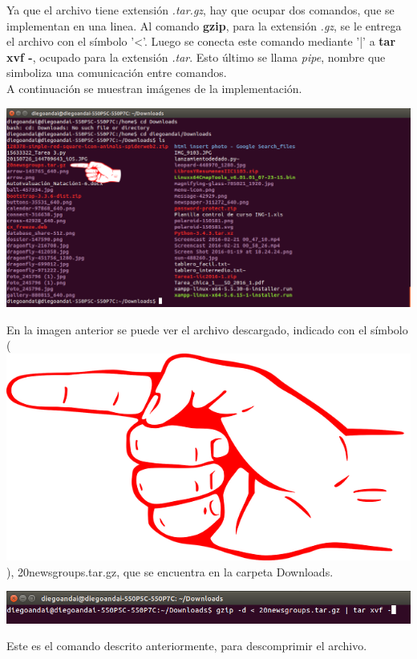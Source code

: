 \documentclass[a4paper,11pt]{article}
\theoremstyle{mytheor}
\begin{document}
Ya que el archivo tiene extensión \textit{.tar.gz}, hay que ocupar dos comandos, que se implementan en una linea. Al comando \textbf{gzip}, para la extensión \textit{.gz}, se le entrega el archivo con el símbolo '<'. Luego se conecta este comando mediante '|'  a \textbf{tar xvf -}, ocupado para la extensión \textit{.tar}. Esto último se llama \textit{pipe}, nombre que simboliza una comunicación entre comandos.\\

A continuación se muestran imágenes de la implementación.
\begin{center}
\includegraphics[scale=0.385]{tc1_2.png}
\end{center}
En la imagen anterior se puede ver el archivo descargado, indicado con el símbolo (\includegraphics[scale=0.03]{finger.png}), 20newsgroups.tar.gz, que se encuentra en la carpeta Downloads.

\begin{center}
\includegraphics[scale=0.53]{tc1_3.png}
\end{center}

Este es el comando descrito anteriormente, para descomprimir el archivo.
\end{document}
